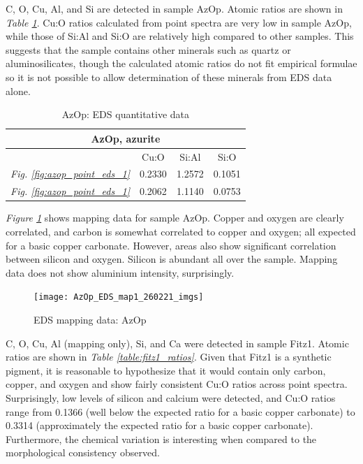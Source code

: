 
C, O, Cu, Al, and Si are detected in sample AzOp. Atomic ratios are shown in \textit{Table \ref{table:azop_ratios}}. Cu:O ratios calculated from point spectra are very low in sample AzOp, while those of Si:Al and Si:O are relatively high compared to other samples. This suggests that the sample contains other minerals such as quartz or aluminosilicates, though the calculated atomic ratios do not fit empirical formulae so it is not possible to allow determination of these minerals from EDS data alone.

\begin{table}[H]
\caption{AzOp: EDS quantitative data}
\centering
\label{table:azop_ratios}
\begin{tabular}{c c c c}
\toprule
\multicolumn{4}{c}{AzOp, azurite} \\
\midrule
~ & Cu:O & Si:Al & Si:O \\
\midrule
\textit{Fig. \ref{fig:azop_point_eds_1}} & 0.2330 & 1.2572 & 0.1051 \\
\textit{Fig. \ref{fig:azop_point_eds_1}} & 0.2062 & 1.1140 & 0.0753 \\
\bottomrule
\end{tabular}
\end{table}

\textit{Figure \ref{fig:azop_map1}} shows mapping data for sample AzOp. Copper and oxygen are clearly correlated, and carbon is somewhat correlated to copper and oxygen; all expected for a basic copper carbonate. However, areas also show significant correlation between silicon and oxygen. Silicon is abundant all over the sample. Mapping data does not show aluminium intensity, surprisingly. 

\begin{figure}[H]
\centering
  \texttt{[image: AzOp\_EDS\_map1\_260221\_imgs]}
\caption[EDS mapping data: AzOp]{EDS mapping data: AzOp}
\label{fig:azop_map1}
\end{figure}


C, O, Cu, Al (mapping only), Si, and Ca were detected in sample Fitz1. Atomic ratios are shown in \textit{Table \ref{table:fitz1_ratios}}. Given that Fitz1 is a synthetic pigment, it is reasonable to hypothesize that it would contain only carbon, copper, and oxygen and show fairly consistent Cu:O ratios across point spectra. Surprisingly, low levels of silicon and calcium were detected, and Cu:O ratios range from 0.1366 (well below the expected ratio for a basic copper carbonate) to 0.3314 (approximately the expected ratio for a basic copper carbonate). Furthermore, the chemical variation is interesting when compared to the morphological consistency observed.


